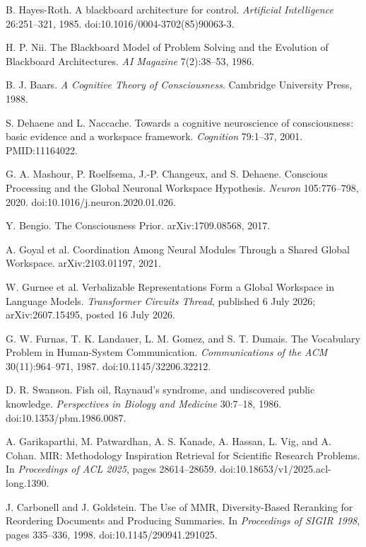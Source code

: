  B. Hayes-Roth. A blackboard architecture for control. \emph{Artificial Intelligence} 26:251--321, 1985. doi:10.1016/0004-3702(85)90063-3.

 H. P. Nii. The Blackboard Model of Problem Solving and the Evolution of Blackboard Architectures. \emph{AI Magazine} 7(2):38--53, 1986.

 B. J. Baars. \emph{A Cognitive Theory of Consciousness}. Cambridge University Press, 1988.

 S. Dehaene and L. Naccache. Towards a cognitive neuroscience of consciousness: basic evidence and a workspace framework. \emph{Cognition} 79:1--37, 2001. PMID:11164022.

 G. A. Mashour, P. Roelfsema, J.-P. Changeux, and S. Dehaene. Conscious Processing and the Global Neuronal Workspace Hypothesis. \emph{Neuron} 105:776--798, 2020. doi:10.1016/j.neuron.2020.01.026.

 Y. Bengio. The Consciousness Prior. arXiv:1709.08568, 2017.

 A. Goyal et al. Coordination Among Neural Modules Through a Shared Global Workspace. arXiv:2103.01197, 2021.

 W. Gurnee et al. Verbalizable Representations Form a Global Workspace in Language Models. \emph{Transformer Circuits Thread}, published 6 July 2026; arXiv:2607.15495, posted 16 July 2026.

 G. W. Furnas, T. K. Landauer, L. M. Gomez, and S. T. Dumais. The Vocabulary Problem in Human-System Communication. \emph{Communications of the ACM} 30(11):964--971, 1987. doi:10.1145/32206.32212.

 D. R. Swanson. Fish oil, Raynaud's syndrome, and undiscovered public knowledge. \emph{Perspectives in Biology and Medicine} 30:7--18, 1986. doi:10.1353/pbm.1986.0087.

 A. Garikaparthi, M. Patwardhan, A. S. Kanade, A. Hassan, L. Vig, and A. Cohan. MIR: Methodology Inspiration Retrieval for Scientific Research Problems. In \emph{Proceedings of ACL 2025}, pages 28614--28659. doi:10.18653/v1/2025.acl-long.1390.

 J. Carbonell and J. Goldstein. The Use of MMR, Diversity-Based Reranking for Reordering Documents and Producing Summaries. In \emph{Proceedings of SIGIR 1998}, pages 335--336, 1998. doi:10.1145/290941.291025.

